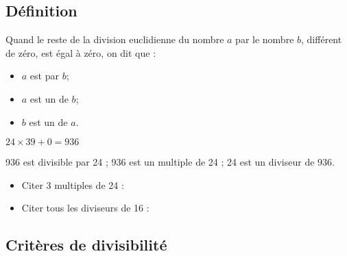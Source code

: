 \subsection{Définition}

\begin{mydefs}
	Quand le reste de la division euclidienne du nombre $a$ par le nombre $b$, différent de zéro, est égal à zéro, on dit que : 
	
	\begin{itemize}
		\item $a$ est  par $b$;
		\item $a$ est un  de $b$;
		\item $b$ est un  de $a$.
	\end{itemize}
	
\end{mydefs}

\begin{myex}
	\begin{multicols}{2}
		\begin{center}
		\end{center}
		
		$24 \times 39 + 0 = 936$
	\end{multicols}

	936 est divisible par 24 ; 936 est un multiple de 24 ; 24 est un diviseur de 936.
\end{myex}


\begin{myexo}
	\begin{itemize}
		\item Citer 3 multiples de 24 :
		\item Citer tous les diviseurs de 16 :
	\end{itemize}
\end{myexo}

\subsection{Critères de divisibilité}

